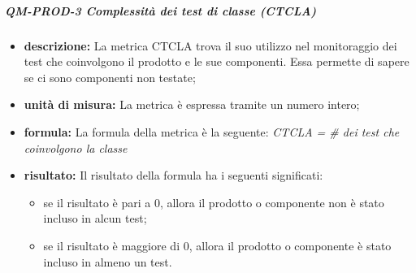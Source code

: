 			\subparagraph{QM-PROD-3 Complessità dei test di classe (CTCLA)}
			\begin{itemize}
      			\item \textbf{descrizione: }
					La metrica CTCLA trova il suo utilizzo nel monitoraggio dei test che coinvolgono il prodotto e le sue componenti. Essa permette di sapere se ci sono componenti non testate;
				\item \textbf{unità di misura: }
					La metrica è espressa tramite un numero intero;
				\item \textbf{formula: }
					La formula della metrica è la seguente:
					\textit{CTCLA = \# dei test che coinvolgono la classe}
				\item \textbf{risultato: }
					Il risultato della formula ha i seguenti significati:
					\begin{itemize}
						\item se il risultato è pari a 0, allora il prodotto o componente non è stato incluso in alcun test;
						\item se il risultato è maggiore di 0, allora il prodotto o componente è stato incluso in almeno un test.
					\end{itemize}
			\end{itemize}
